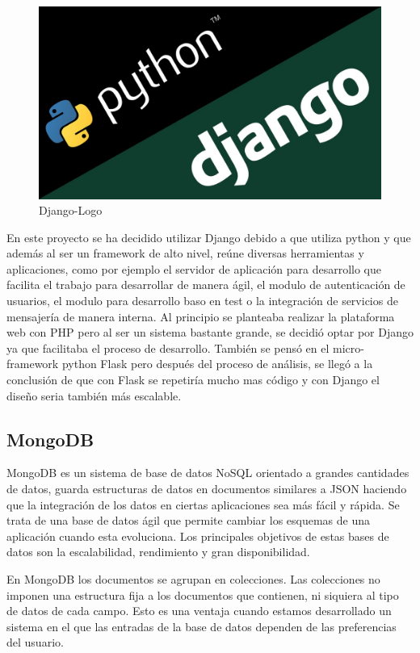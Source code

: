 \documentclass[a4paper,11pt]{book}
\begin{document}
\begin{figure}[H] 
\centering 
\includegraphics[scale=0.25]{imagenes/desarrollo_herramienta/django.jpg}
\caption{ Django-Logo\cite{djL}  }  
\end{figure} 

En este proyecto se ha decidido utilizar Django debido a que utiliza python y que además al ser un framework de alto nivel, reúne diversas herramientas y aplicaciones, como por ejemplo el servidor de aplicación para desarrollo que facilita el trabajo para desarrollar de manera ágil, el modulo de autenticación de usuarios, el modulo para desarrollo baso en test o la integración de servicios de mensajería de manera interna. Al principio se planteaba realizar la plataforma web con PHP pero al ser un sistema bastante grande, se decidió optar por Django ya que facilitaba el proceso de desarrollo. También se pensó en el micro-framework python Flask pero después del proceso de análisis, se llegó a la conclusión de que con Flask\cite{fl} se repetiría mucho mas código y con Django el diseño seria también más escalable.

\subsection{MongoDB}

MongoDB\cite{mg} es un sistema de base de datos NoSQL orientado a grandes cantidades de datos, guarda estructuras de datos en documentos similares a JSON haciendo que la integración de los datos en ciertas aplicaciones sea más fácil y rápida.
Se trata de una base de datos ágil que permite cambiar los esquemas de una aplicación cuando esta evoluciona. Los principales objetivos de estas bases de datos son la escalabilidad, rendimiento y gran disponibilidad.

En MongoDB los documentos se agrupan en colecciones. Las colecciones  no imponen una estructura fija a los documentos que contienen, ni siquiera al tipo de datos de cada campo. Esto es una ventaja cuando estamos desarrollado un sistema en el que las entradas de la base de datos dependen de las preferencias del usuario.
\end{document}
